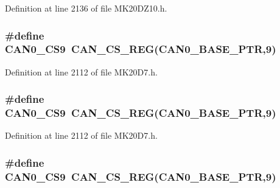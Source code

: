 Definition at line 2136 of file M\+K20\+D\+Z10.\+h.

\subsubsection[{\texorpdfstring{C\+A\+N0\+\_\+\+C\+S9}{CAN0_CS9}}]{\setlength{\rightskip}{0pt plus 5cm}\#define C\+A\+N0\+\_\+\+C\+S9~{\bf C\+A\+N\+\_\+\+C\+S\+\_\+\+R\+EG}({\bf C\+A\+N0\+\_\+\+B\+A\+S\+E\+\_\+\+P\+TR},9)}\hypertarget{group___c_a_n___register___accessor___macros_gab1f6e43b96e879563835e49be171ecd0}{}\label{group___c_a_n___register___accessor___macros_gab1f6e43b96e879563835e49be171ecd0}


Definition at line 2112 of file M\+K20\+D7.\+h.

\subsubsection[{\texorpdfstring{C\+A\+N0\+\_\+\+C\+S9}{CAN0_CS9}}]{\setlength{\rightskip}{0pt plus 5cm}\#define C\+A\+N0\+\_\+\+C\+S9~{\bf C\+A\+N\+\_\+\+C\+S\+\_\+\+R\+EG}({\bf C\+A\+N0\+\_\+\+B\+A\+S\+E\+\_\+\+P\+TR},9)}\hypertarget{group___c_a_n___register___accessor___macros_gab1f6e43b96e879563835e49be171ecd0}{}\label{group___c_a_n___register___accessor___macros_gab1f6e43b96e879563835e49be171ecd0}


Definition at line 2112 of file M\+K20\+D7.\+h.

\subsubsection[{\texorpdfstring{C\+A\+N0\+\_\+\+C\+S9}{CAN0_CS9}}]{\setlength{\rightskip}{0pt plus 5cm}\#define C\+A\+N0\+\_\+\+C\+S9~{\bf C\+A\+N\+\_\+\+C\+S\+\_\+\+R\+EG}({\bf C\+A\+N0\+\_\+\+B\+A\+S\+E\+\_\+\+P\+TR},9)}\hypertarget{group___c_a_n___register___accessor___macros_gab1f6e43b96e879563835e49be171ecd0}{}\label{group___c_a_n___register___accessor___macros_gab1f6e43b96e879563835e49be171ecd0}



